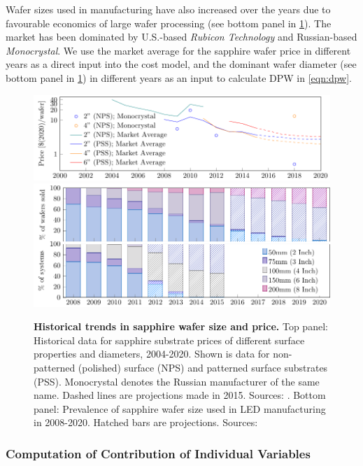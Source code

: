 \documentclass[parskip=full]{article}
\begin{document}
Wafer sizes used in manufacturing have also increased over the years due to favourable economics of large wafer processing (see bottom panel in \cref{fig:wafers}). The market has been dominated by U.S.-based \textit{Rubicon Technology} and Russian-based \textit{Monocrystal}. We use the market average for the sapphire wafer price in different years as a direct input into the cost model, and the dominant wafer diameter (see bottom panel in \cref{fig:wafers}) in different years as an input to calculate DPW in \cref{eqn:dpw}.

\begin{figure}[h!]
    \includegraphics[width=15cm]{./figures/sapphire_prices.pdf}
    \includegraphics[width=14.5cm]{./figures/wafer_size.pdf}
	\caption{\textbf{Historical trends in sapphire wafer size and price.} Top panel: Historical data for sapphire substrate prices of different surface properties and diameters, 2004-2020. Shown is data for non-patterned (polished) surface (NPS) and patterned surface substrates (PSS). Monocrystal denotes the Russian manufacturer of the same name. Dashed lines are projections made in 2015. Sources: \cite{monocrystal2020private}\cite{yole2011sapphire}\cite{yole2015sapphire}. Bottom panel: Prevalence of sapphire wafer size used in LED manufacturing in 2008-2020. Hatched bars are projections. Sources: \cite{veeco2013}\cite{Scholand2012}\cite{yole2015sapphire}}
	\label{fig:wafers}
\end{figure}

\subsubsection{Computation of Contribution of Individual Variables}
\label{sec:contribution_variables}
\end{document}
